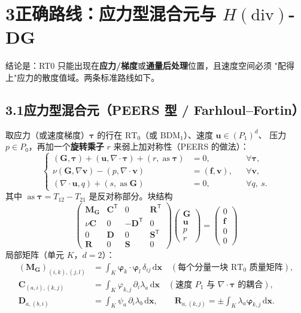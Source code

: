 \documentclass[UTF8,11pt,a4paper]{ctexart}
\theoremstyle{wjplain}
\theoremstyle{wjdef}
\newcommand{\dd}{\,\mathrm{d}}
\newcommand{\bu}{\boldsymbol u}
\newcommand{\bv}{\boldsymbol v}
\newcommand{\bx}{\boldsymbol x}
\newcommand{\bG}{\boldsymbol G}
\newcommand{\bC}{\boldsymbol C}
\newcommand{\bD}{\boldsymbol D}
\newcommand{\bM}{\boldsymbol M}
\newcommand{\bR}{\boldsymbol R}
\newcommand{\bS}{\boldsymbol S}
\newcommand{\bvarphi}{\boldsymbol\varphi}
\newcommand{\bT}{\boldsymbol\tau}
\newcommand{\grad}{\nabla}
\newcommand{\dive}{\nabla\cdot}
\newcommand{\RT}{\mathrm{RT}}
\begin{document}
\section{\texorpdfstring{3\quad 正确路线：应力型混合元与 $H(\mathrm{div})$-DG}{3 正确路线：应力型混合元与 H(div)-DG}}

结论是：RT0 只能出现在\textbf{应力/梯度}或\textbf{通量后处理}位置，且速度空间必须
"配得上"应力的散度值域。两条标准路线如下。

\subsection*{3.1\quad 应力型混合元（PEERS 型 / Farhloul--Fortin）}

取应力（或速度梯度）$\bT$ 的行在 $\RT_0$（或 $\mathrm{BDM}_1$）、速度 $\bu\in(P_1)^d$、
压力 $p\in P_0$，再加一个\textbf{旋转乘子} $r$ 来弱上加对称性（PEERS 的做法）：
\begin{equation}\tag{3.1}\label{eq:peers}
  \left\{
  \begin{aligned}
    (\bG,\bT)+(\bu,\dive\bT)+(r,\operatorname{as}\bT)&=0, &&\forall\bT,\\
    \nu(\bG,\grad\bv)-(p,\dive\bv)&=(\boldsymbol f,\bv), &&\forall\bv,\\
    (\dive\bu,q)+(s,\operatorname{as}\bG)&=0, &&\forall q,\ s .
  \end{aligned}
  \right.
\end{equation}
其中 $\operatorname{as}\bT=T_{12}-T_{21}$ 是反对称部分。块结构
\begin{equation}\tag{3.2}
  \begin{pmatrix}
    \bM_{\bG} & \bC^{\mathsf T} & 0 & \bR^{\mathsf T}\\
    \nu\bC & 0 & -\bD^{\mathsf T} & 0\\
    0 & \bD & 0 & \bS^{\mathsf T}\\
    \bR & 0 & \bS & 0
  \end{pmatrix}
  \begin{pmatrix}\bG\\ \bu\\ p\\ r\end{pmatrix}
  =\begin{pmatrix}0\\ \boldsymbol f\\ 0\\ 0\end{pmatrix}
\end{equation}
局部矩阵（单元 $K$，$d=2$）：
\begin{align}
  (\bM_{\bG})_{(i,k),(j,l)}&=\int_K\bvarphi_k\cdot\bvarphi_l\,\delta_{ij}\dd\bx
    \quad(\text{每个分量一块 } \RT_0 \text{ 质量矩阵}),\tag{3.3}\\
  \bC_{(a,i),(k,j)}&=\int_K\varphi_{k,j}\,\partial_i\lambda_a\dd\bx
    \quad(\text{速度 }P_1\text{ 与 }\dive\bT\text{ 的耦合}),\tag{3.4}\\
  \bD_{a,(b,i)}&=\int_K\psi_a\,\partial_i\lambda_b\dd\bx,\qquad
  \bR_{a,(k,j)}=\pm\int_K\lambda_a\bvarphi_{k,j}\dd\bx .\tag{3.5}
\end{align}
\end{document}
